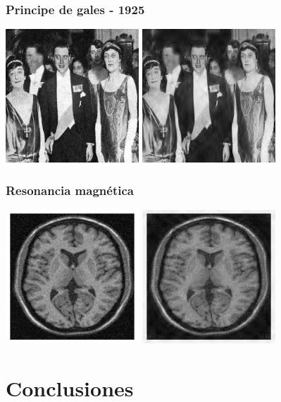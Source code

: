 \documentclass{beamer}
\begin{document}
  \begin{frame}
    \frametitle{Principe de gales - 1925}
    \centering
    \includegraphics[width=5cm]{imgs/Real-resize/1.jpg}
    \includegraphics[width=5cm]{imgs/Real/1.jpg}
   
  \end{frame}

  \begin{frame}
    \frametitle{Resonancia magnética}
    \centering
    \includegraphics[width=5cm]{imgs/Real-resize/0.jpg}
    \includegraphics[width=5cm]{imgs/Real/0.jpg}  
  \end{frame}

  \section{Conclusiones}
\end{document}

